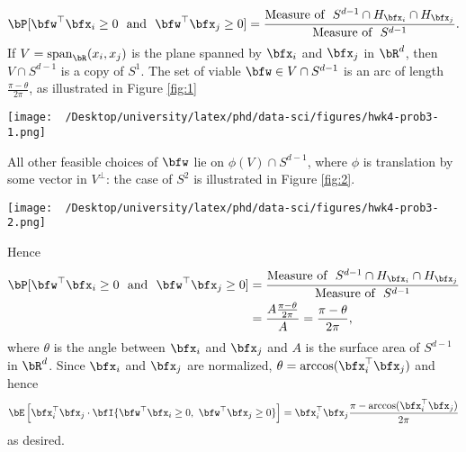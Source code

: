 \begin{homework}[e]
\begin{prf}
\begin{enumerate}[(a)]
          \begin{align*} 
            \bP[\bfw^\top \bfx_i \geq 0 ~\text{ and } ~ \bfw^\top\bfx_j \geq 0] = \frac{\text{Measure of } ~S^{d-1} \cap H_{\bfx_i} \cap H_{\bfx_j}}{\text{Measure of } ~ S^{d-1}}.
          \end{align*}
          If $V = \operatorname{span}_{\bR}(x_i,x_j)$ is the plane spanned by $\bfx_i$ and $\bfx_j$ in $\bR^d$, then $V \cap S^{d-1}$ is a copy of $S^1$. The set of viable $\bfw \in V\cap S^{d-1}$ is an arc of length $\frac{\pi - \theta}{2\pi}$, as illustrated in Figure \ref{fig:1}
          \begin{center}
            \texttt{[image: ~/Desktop/university/latex/phd/data-sci/figures/hwk4-prob3-1.png]}
            \label{fig:1}
          \end{center}
          All other feasible choices of $\bfw$ lie on $\phi(V)\cap S^{d-1}$, where $\phi$ is translation by some vector in $V^\perp$: the case of $S^2$ is illustrated in Figure \ref{fig:2}.
          \begin{center}
            \texttt{[image: ~/Desktop/university/latex/phd/data-sci/figures/hwk4-prob3-2.png]}
            \label{fig:2}
          \end{center}
          Hence
          \begin{align*}
            \bP[\bfw^\top \bfx_i \geq 0 ~\text{ and } ~ \bfw^\top\bfx_j \geq 0] 
            &= \frac{\text{Measure of } ~S^{d-1} \cap H_{\bfx_i} \cap H_{\bfx_j}}{\text{Measure of } ~ S^{d-1}} \\
            &= \frac{A\frac{\pi - \theta}{2\pi}}{A} = \frac{\pi - \theta}{2\pi},
          \end{align*}
          where $\theta$ is the angle between $\bfx_i$ and $\bfx_j$ and $A$ is the surface area of $S^{d-1}$ in $\bR^d$. Since $\bfx_i$ and $\bfx_j$ are normalized, $\theta = \arccos(\bfx_i^\top\bfx_j)$ and hence
          \begin{align*}
            \bE\left[\bfx_i^\top \bfx_j \cdot \bfI\{\bfw^\top \bfx_i \geq 0, ~ \bfw^\top\bfx_j \geq 0\}\right] = \bfx_i^\top\bfx_j \frac{\pi - \arccos(\bfx_i^\top\bfx_j)}{2\pi}
          \end{align*}
          as desired.
      \end{enumerate}
    \end{prf}
    \prob $ $
    \begin{enumerate}[(a)]

\end{enumerate}
\end{homework}
